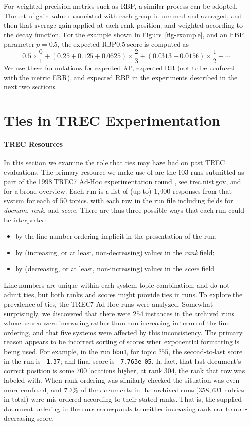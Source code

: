 \documentclass[runningheads,a4paper]{llncs}
\newcommand{\myparagraph}[1]{\vspace*{-0.7ex}\paragraph*{\normalsize\bf{#1}}}
\begin{document}
For weighted-precision metrics such as RBP, a similar process can be
adopted.
The set of gain values associated with each group is summed and
averaged, and then that average gain applied at each rank position,
and weighted according to the decay function.
For the example shown in Figure~\ref{fig-example}, and an RBP
parameter $p=0.5$, the expected RBP0.5 score is computed as
\newcommand{\mysub}[2]{{#1}_{\mbox{\scriptsize{\,#2}}}}
\[
		0.5\times
				\frac{0}{1}
	+
	(0.25+0.125+0.0625)\times
				\frac{2}{3}
	+
	(0.0313+0.0156)\times
				\frac{1}{2}
	+
	\cdots
\]
We use these formulations for expected AP, expected RR (not to be
confused with the metric ERR), and expected RBP in the experiments
described in the next two sections.
 \section{Ties in TREC Experimentation}
\label{sec-trecimpact}

\myparagraph{TREC Resources}

In this section we examine the role that ties may have had on past
TREC evaluations.
The primary resource we make use of are the $103$ runs submitted as
part of the 1998 TREC7 Ad-Hoc experimentation round
{\citep{vh98trec}}, see {\small\url{trec.nist.gov}}, and
{\citet{harman05trecbook}} for a broad overview.
Each run is a list of (up to) $1{,}000$ responses from that system
for each of $50$ topics, with each row in the run file including
fields for {\emph{docnum}}, {\emph{rank}}, and {\emph{score}}.
There are thus three possible ways that each run could be
interpreted:
\begin{itemize}
\item
by the line number ordering implicit in the presentation of the run;
\item
by (increasing, or at least, non-decreasing) values in the
{\emph{rank}} field;
\item
by (decreasing, or at least, non-increasing) values in the
{\emph{score}} field.
\end{itemize}
Line numbers are unique within each system-topic combination, and do
not admit ties, but both ranks and scores might provide ties in runs.
To explore the prevalence of ties, the TREC7 Ad-Hoc runs were
analyzed.
Somewhat surprisingly, we discovered that there were $254$ instances
in the archived runs where scores were increasing rather than
non-increasing in terms of the line ordering, and that five systems
were affected by this inconsistency.
The primary reason appears to be incorrect sorting of scores when
exponential formatting is being used.
For example, in the run {\tt{bbn1}}, for topic $355$, the
second-to-last score in the run is {\tt{-1.37}}; and final score is
{\tt{-7.763e-05}}.
In fact, that last document's correct position is some $700$
locations higher, at rank $304$, the rank that row was labeled with.
When rank ordering was similarly checked the situation was even more
confused, and $7.3$\% of the documents in the archived runs
($358{,}631$ entries in total) were mis-ordered according to their
stated ranks.
That is, the supplied document ordering in the runs corresponds to
neither increasing rank nor to non-decreasing score.
\end{document}
